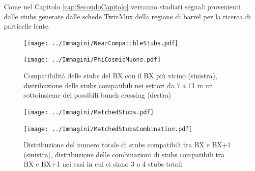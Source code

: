 
Come nel Capitolo \ref{cap:SecondoCapitolo} verranno studiati segnali provenienti dalle stubs generate dalle schede TwinMux della regione di barrel per la ricerca di particelle lente.


\begin{figure}[t]
  \centering
  \begin{minipage}[b]{0.48\textwidth}
    \centering
    \texttt{[image: ../Immagini/NearCompatibleStubs.pdf]} 
    \end{minipage}
    \hfill 
    \begin{minipage}[b]{0.48\textwidth}
      \centering
      \texttt{[image: ../Immagini/PhiCosmicMuons.pdf]} 
    \end{minipage}
    \caption{Compatibilità delle stubs del BX con il BX più vicino (sinistra), distribuzione delle stubs compatibili nei settori da 7 a 11 in un sottoinsieme dei possibili bunch crossing (destra)}
  \label{fig:MatchedStubsRate}
\end{figure}



\begin{figure}[t]
  \centering
  \begin{minipage}[b]{0.49\textwidth}
    \centering
    \texttt{[image: ../Immagini/MatchedStubs.pdf]} 
    \end{minipage}
    \hfill 
    \begin{minipage}[b]{0.49\textwidth}
      \centering
      \texttt{[image: ../Immagini/MatchedStubsCombination.pdf]} 
    \end{minipage}
    \caption{Distribuzione del numero totale di stubs compatibili tra BX e BX+1 (sinistra), distribuzione delle combinazioni di stubs compatibili tra BX e BX+1 nei casi in cui ci siano 3 o 4 stubs totali}
  \label{fig:MatchedStubsCombination}
\end{figure}

